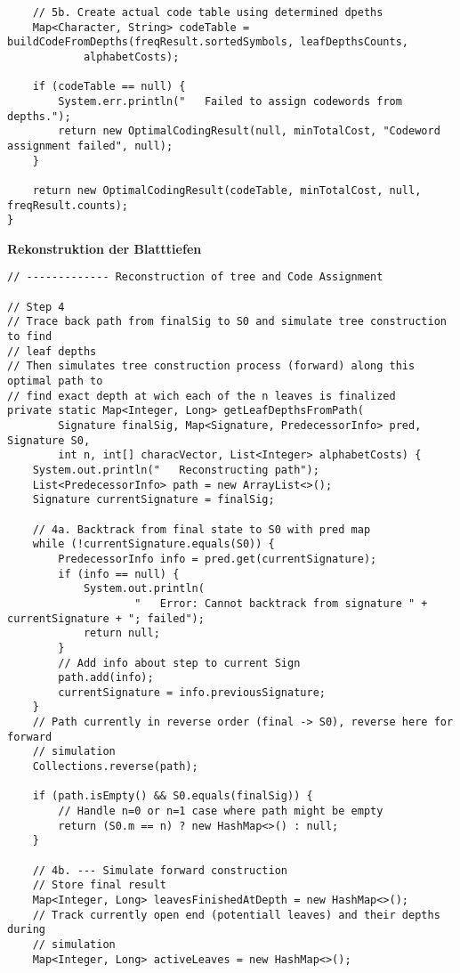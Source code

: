 \documentclass[a4paper,10pt,ngerman]{scrartcl}
\begin{document}
\begin{lstlisting}
    // 5b. Create actual code table using determined dpeths
    Map<Character, String> codeTable = buildCodeFromDepths(freqResult.sortedSymbols, leafDepthsCounts,
            alphabetCosts);

    if (codeTable == null) {
        System.err.println("   Failed to assign codewords from depths.");
        return new OptimalCodingResult(null, minTotalCost, "Codeword assignment failed", null);
    }

    return new OptimalCodingResult(codeTable, minTotalCost, null, freqResult.counts);
}
\end{lstlisting}
\textbf{Rekonstruktion der Blatttiefen}
\begin{lstlisting}
// ------------- Reconstruction of tree and Code Assignment

// Step 4
// Trace back path from finalSig to S0 and simulate tree construction to find
// leaf depths
// Then simulates tree construction process (forward) along this optimal path to
// find exact depth at wich each of the n leaves is finalized
private static Map<Integer, Long> getLeafDepthsFromPath(
        Signature finalSig, Map<Signature, PredecessorInfo> pred, Signature S0,
        int n, int[] characVector, List<Integer> alphabetCosts) {
    System.out.println("   Reconstructing path");
    List<PredecessorInfo> path = new ArrayList<>();
    Signature currentSignature = finalSig;

    // 4a. Backtrack from final state to S0 with pred map
    while (!currentSignature.equals(S0)) {
        PredecessorInfo info = pred.get(currentSignature);
        if (info == null) {
            System.out.println(
                    "   Error: Cannot backtrack from signature " + currentSignature + "; failed");
            return null;
        }
        // Add info about step to current Sign
        path.add(info);
        currentSignature = info.previousSignature;
    }
    // Path currently in reverse order (final -> S0), reverse here for forward
    // simulation
    Collections.reverse(path);

    if (path.isEmpty() && S0.equals(finalSig)) {
        // Handle n=0 or n=1 case where path might be empty
        return (S0.m == n) ? new HashMap<>() : null;
    }

    // 4b. --- Simulate forward construction
    // Store final result
    Map<Integer, Long> leavesFinishedAtDepth = new HashMap<>();
    // Track currently open end (potentiall leaves) and their depths during
    // simulation
    Map<Integer, Long> activeLeaves = new HashMap<>();


\end{lstlisting}
\end{document}
